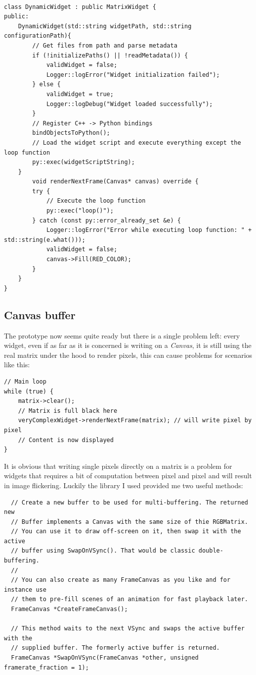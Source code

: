 \begin{verbatim}

class DynamicWidget : public MatrixWidget {
public:
    DynamicWidget(std::string widgetPath, std::string configurationPath){
        // Get files from path and parse metadata
        if (!initializePaths() || !readMetadata()) {
            validWidget = false;
            Logger::logError("Widget initialization failed");
        } else {
            validWidget = true;
            Logger::logDebug("Widget loaded successfully");
        }
        // Register C++ -> Python bindings
        bindObjectsToPython();
        // Load the widget script and execute everything except the loop function
        py::exec(widgetScriptString);
    }
        void renderNextFrame(Canvas* canvas) override {
        try {
            // Execute the loop function
            py::exec("loop()");
        } catch (const py::error_already_set &e) {
            Logger::logError("Error while executing loop function: " + std::string(e.what()));
            validWidget = false;
            canvas->Fill(RED_COLOR);
        }
    }
}
\end{verbatim}

\newpage

\subsection{Canvas buffer}
The prototype now seems quite ready but there is a single problem left: every widget, even if as far as it is concerned is writing on a \textit{Canvas}, it is still using the real matrix under the hood to render pixels, this can cause problems for scenarios like this:

\begin{verbatim}
// Main loop
while (true) {
    matrix->clear();
    // Matrix is full black here
    veryComplexWidget->renderNextFrame(matrix); // will write pixel by pixel
    // Content is now displayed
}
\end{verbatim}

It is obvious that writing single pixels directly on a matrix is a problem for widgets that requires a bit of computation between pixel and pixel and will result in image flickering.
Luckily the library I used provided me two useful methods:

\begin{verbatim}
  // Create a new buffer to be used for multi-buffering. The returned new
  // Buffer implements a Canvas with the same size of thie RGBMatrix.
  // You can use it to draw off-screen on it, then swap it with the active
  // buffer using SwapOnVSync(). That would be classic double-buffering.
  //
  // You can also create as many FrameCanvas as you like and for instance use
  // them to pre-fill scenes of an animation for fast playback later.
  FrameCanvas *CreateFrameCanvas();

  // This method waits to the next VSync and swaps the active buffer with the
  // supplied buffer. The formerly active buffer is returned.
  FrameCanvas *SwapOnVSync(FrameCanvas *other, unsigned framerate_fraction = 1);
\end{verbatim}

